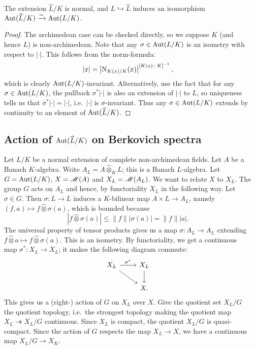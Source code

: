 \begin{lemma}
The extension $\widehat L/K$ is normal, and $L\hookrightarrow \widehat L$ 
induces an isomorphism $\operatorname{Aut}(\widehat L/K)\xrightarrow\sim \operatorname{Aut}(L/K)$. 
\end{lemma}
\begin{proof}
The archimedean case can be checked directly, so we suppose $K$ (and hence $L$) 
is non-archimedean. Note that any $\sigma\in \operatorname{Aut}(L/K)$ is an isometry with 
respect to $|\cdot|$. This follows from the norm-formula:
\[
  |x| = \left|\operatorname{N}_{K(x)/K}(x)\right|^{[K(x)\colon K]^{-1}} ,
\]
which is clearly $\operatorname{Aut}(L/K)$-invariant. Alternatively, use the fact that for 
any $\sigma\in \operatorname{Aut}(L/K)$, the pullback $\sigma^\ast |\cdot|$ is also an 
extension of $|\cdot|$ to $L$, so uniqueness tells us that 
$\sigma^\ast|\cdot|=|\cdot|$, i.e.~$|\cdot|$ is $\sigma$-invariant. Thus any 
$\sigma\in \operatorname{Aut}(L/K)$ extends by continuity to an element of 
$\operatorname{Aut}(\widehat L/K)$. 
\end{proof}



\subsection{Action of \texorpdfstring{$\operatorname{Aut}(\widehat L/K)$}{Aut(L/K)} on Berkovich spectra}

Let $L/K$ be a normal extension of complete non-archimedean fields. Let 
$A$ be a Banach $K$-algebra. Write $A_L=A\widehat\otimes_K L$; this is a 
Banach $L$-algebra. Let $G=\operatorname{Aut}(L/K)$, $X=\operatorname{\mathscr{M}}(A)$ and 
$X_L=\operatorname{\mathscr{M}}(A_L)$. We want to relate $X$ to $X_L$. The group $G$ acts on 
$A_L$ and hence, by functoriality $X_L$ in the following way. Let 
$\sigma\in G$. Then $\sigma\colon L\to L$ induces a $K$-bilinear map 
$A\times L\to A_L$, namely $(f,a)\mapsto f\widehat\otimes \sigma(a)$, which 
is bounded because 
\[
  |f\widehat\otimes \sigma(a)| \leqslant \|f\| |\sigma(a)| = \|f\| |a| .
\]
The universal property of tensor products gives us a map 
$\sigma\colon A_L\to A_L$ extending 
$f\widehat\otimes a\mapsto f\widehat\otimes \sigma(a)$. This is an isometry. By 
functoriality, we get a continuous map $\sigma^\ast\colon X_L\to X_L$; it makes 
the following diagram commute:
\[
\begin{tikzcd}
	X_L \ar[r, "\sigma^\ast"] \ar[dr]
		& X_L \ar[d] \\
	& X .
\end{tikzcd}
\]
This gives us a (right-) action of $G$ on $X_L$ over $X$. Give the quotient set 
$X_L/G$ the quotient topology, i.e.~the strongest topology making the quotient 
map $X_L\twoheadrightarrow X_L/G$ continuous. Since $X_L$ is compact, the 
quotient $X_L/G$ is quasi-compact. Since the action of $G$ respects the map 
$X_L\to X$, we have a continuous map $X_L/G\to X_K$. 

